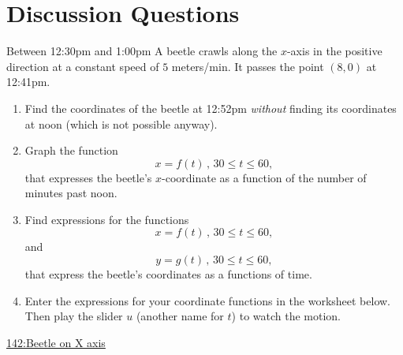 \documentclass{ximera}
\begin{document}
\section{Discussion Questions}

\begin{question}  \label{Qrtt54tghhhgfd}
Between 12:30pm and 1:00pm A beetle crawls along the $x$-axis in the positive direction at a constant speed of $5$ meters/min. It passes the point $(8,0)$ at 12:41pm. 

\begin{enumerate}
\item Find the coordinates of the beetle at 12:52pm \emph{without} finding its coordinates at noon (which is not possible anyway).

\item Graph the function 
\[
    x = f(t) \, , \, 30\leq t \leq 60 ,
\] 
that expresses the beetle's $x$-coordinate as a function of the number of minutes past noon.

\item Find expressions for the functions
\[
    x = f(t) \, , \, 30\leq t \leq 60 ,
\] 
and 
\[
    y = g(t) \, , \, 30\leq t \leq 60 ,
\] 
that express the beetle's coordinates as a functions of time.

\item Enter the expressions for your coordinate functions in the worksheet below. Then play the slider $u$ (another name for $t$) to watch the motion.

\end{enumerate}

\begin{onlineOnly}
    \begin{center}
\end{center}
\end{onlineOnly}

\href{https://www.desmos.com/calculator/bxq8ehlo0t}{142:Beetle on X axis}


\end{question}
\end{document}
